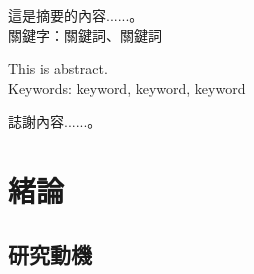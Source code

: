 \documentclass[12pt,a4paper,oneside]{book}
\begin{document}
\hypersetup{pageanchor=false}

\makeNFUCover

% 

\makeNFUTitlePage

\makeNFUApprovalPage




\NFUFrontMatter
\NFUWatermarkOn

\begin{NFUAbstractZH}
這是摘要的內容......。\\
\newline
\noindent
關鍵字：關鍵詞、關鍵詞
\end{NFUAbstractZH}
\begin{NFUAbstractEN}
This is abstract.\\

\noindent
Keywords: keyword, keyword, keyword
\end{NFUAbstractEN}


\begin{NFUAcknowledge}
誌謝內容......。
\end{NFUAcknowledge}

\clearpage
\tableofcontents
\clearpage
\listoftables
\clearpage
\listoffigures

\NFUMainMatter
{}


\chapter{緒論}
\label{c:intro}

\section{研究動機}
\end{document}
